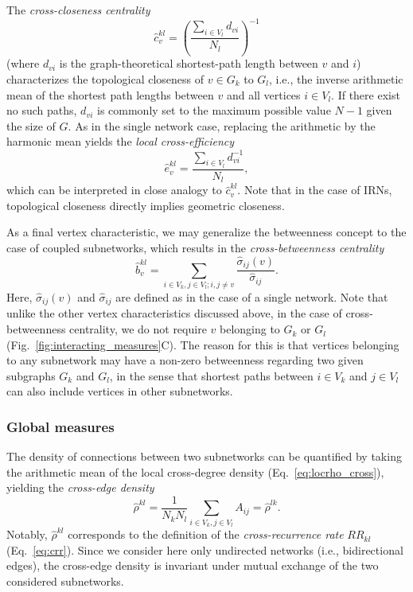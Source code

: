 \documentclass[graybox]{svmult}
\begin{document}
The \textit{cross-closeness centrality}
\begin{equation}
\hat{c}_v^{kl} = \left(\frac{\sum_{i \in V_l} d_{vi}}{N_l}\right)^{-1}
\label{eq:closeness_cross}
\end{equation}
\noindent
(where $d_{vi}$ is the graph-theoretical shortest-path length between $v$ and $i$) characterizes the topological closeness of $v\in G_k$ to $G_l$, i.e., the inverse arithmetic mean of the shortest path lengths between $v$ and all vertices $i\in V_l$. If there exist no such paths, $d_{vi}$ is commonly set to the maximum possible value $N-1$ given the size of $G$. As in the single network case, replacing the arithmetic by the harmonic mean yields the \textit{local cross-efficiency}
\begin{equation}
\hat{e}_v^{kl} = \frac{\sum_{i \in V_l} d_{vi}^{-1}}{N_l},
\label{eq:locefficiency_cross}
\end{equation}
\noindent
which can be interpreted in close analogy to $\hat{c}_v^{kl}$. Note that in the case of IRNs, topological closeness directly implies geometric closeness.

As a final vertex characteristic, we may generalize the betweenness concept to the case of coupled subnetworks, which results in the \textit{cross-betweenness centrality}
\begin{equation}
\hat{b}_v^{kl} = \sum_{i\in V_k,j\in V_l;i,j\neq v} \frac{\hat{\sigma}_{ij}(v)}{\hat{\sigma}_{ij}}.
\label{eq:betweenness_cross}
\end{equation}
\noindent
Here, $\hat{\sigma}_{ij}(v)$ and $\hat{\sigma}_{ij}$ are defined as in the case of a single network. Note that unlike the other vertex characteristics discussed above, in the case of cross-betweenness centrality, we do not require $v$ belonging to $G_k$ or $G_l$  (Fig.~\ref{fig:interacting_measures}C). The reason for this is that vertices belonging to any subnetwork may have a non-zero betweenness regarding two given subgraphs $G_k$ and $G_l$, in the sense that shortest paths between $i\in V_k$ and $j\in V_l$ can also include vertices in other subnetworks. 


\subsubsection{Global measures}

The density of connections between two subnetworks can be quantified by taking the arithmetic mean of the local cross-degree density (Eq.~\ref{eq:locrho_cross}), yielding the \textit{cross-edge density}
\begin{equation}
\hat{\rho}^{kl} = \frac{1}{N_k N_l} \sum_{i \in V_k, j \in V_l} A_{ij} = \hat{\rho}^{lk}.
\label{eq:globrho_cross}
\end{equation}
Notably, $\hat{\rho}^{kl}$ corresponds to the definition of the \textit{cross-recurrence rate} $RR_{kl}$ (Eq.~\ref{eq:crr}). Since we consider here only undirected networks (i.e., bidirectional edges), the cross-edge density is invariant under mutual exchange of the two considered subnetworks.
\end{document}
